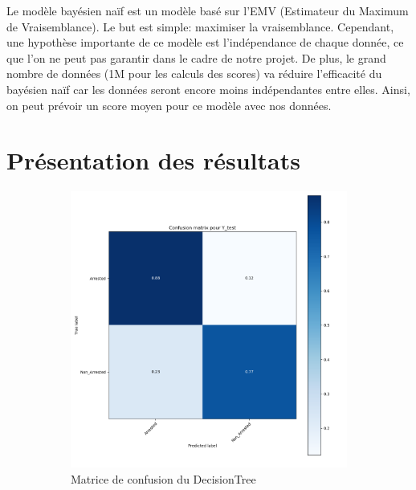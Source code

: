 \documentclass{article}
\begin{document}
    Le modèle bayésien naïf est un modèle basé sur l'EMV
    (Estimateur du Maximum de Vraisemblance).
    Le but est simple: maximiser la vraisemblance. 
    Cependant, une hypothèse importante de ce modèle est l'indépendance de chaque donnée,
    ce que l'on ne peut pas garantir dans le cadre de notre projet.
    De plus, le grand nombre de données (1M pour les calculs des scores) va réduire l'efficacité du bayésien naïf car les données seront encore moins indépendantes entre elles.
    Ainsi, on peut prévoir un score moyen pour ce modèle avec nos données.
    

    \section{Présentation des résultats}

    \begin{figure}[H]
	    \begin{subfigure}{.45\textwidth}
		    \includegraphics[scale=.314]{images/MatriceConfusionDecisionTree.png}
		    \centering
		    \caption{Matrice de confusion du DecisionTree}
	    \end{subfigure}
	    \begin{subfigure}{.45\textwidth}
		    \centering

\end{subfigure}
\end{figure}
\end{document}
